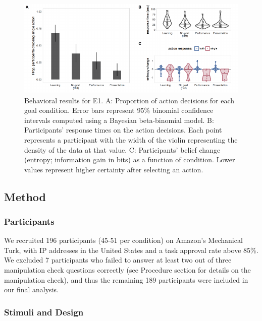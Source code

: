 \documentclass[10pt, letterpaper]{article}
\newenvironment{CodeChunk}{}{}
\begin{document}
\begin{CodeChunk}
\begin{figure}[tb]

{\centering \includegraphics[width=0.95\linewidth]{figs/e1_behav_results_plot-1} 

}

\caption[Behavioral results for E1]{Behavioral results for E1. A: Proportion of action decisions for each goal condition. Error bars represent 95\% binomial confidence intervals computed using a Bayesian beta-binomial model. B: Participants' response times on the action decisions. Each point represents a participant with the width of the violin representing the density of the data at that value. C: Participants' belief change (entropy; information gain in bits) as a function of condition. Lower values represent higher certainty after selecting an action.}\label{fig:e1_behav_results_plot}
\end{figure}
\end{CodeChunk}

\subsection{Method}\label{method}

\subsubsection{Participants}\label{participants}

We recruited 196 participants (45-51 per condition) on Amazon's
Mechanical Turk, with IP addresses in the United States and a task
approval rate above 85\%. We excluded 7 participants who failed to
answer at least two out of three manipulation check questions correctly
(see Procedure section for details on the manipulation check), and thus
the remaining 189 participants were included in our final analysis.

\subsubsection{Stimuli and Design}\label{stimuli-and-design}
\end{document}
